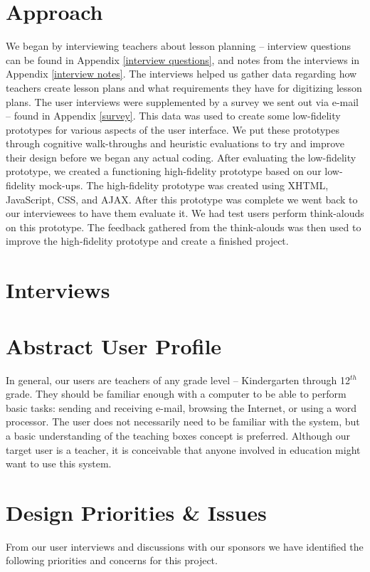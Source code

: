 \documentclass[10pt,letter]{article}
\begin{document}
\section{Approach}
We began by interviewing teachers about lesson planning -- interview questions
can be found in Appendix \ref{interview questions}, and notes from the
interviews in Appendix \ref{interview notes}. The interviews helped us gather
data regarding how teachers create lesson plans and what requirements they have
for digitizing lesson plans. The user interviews were supplemented by a survey
we sent out via e-mail -- found in Appendix \ref{survey}. This data was used to
create some low-fidelity prototypes for various aspects of the user interface.
We put these prototypes through cognitive walk-throughs and heuristic
evaluations to try and improve their design before we began any actual coding.
After evaluating the low-fidelity prototype, we created a functioning
high-fidelity prototype based on our low-fidelity mock-ups. The high-fidelity
prototype was created using XHTML, JavaScript, CSS, and AJAX. After this
prototype was complete we went back to our interviewees to have them evaluate
it. We had test users perform think-alouds on this prototype.  The feedback
gathered from the think-alouds was then used to improve the high-fidelity
prototype and create a finished project.

\section{Interviews}


\section{Abstract User Profile}
In general, our users are teachers of any grade level -- Kindergarten through
12$^{th}$ grade. They should be familiar enough with a computer to be able to
perform basic tasks: sending and receiving e-mail, browsing the Internet, or
using a word processor. The user does not necessarily need to be familiar with
the system, but a basic understanding of the teaching boxes concept is
preferred. Although our target user is a teacher, it is conceivable that anyone
involved in education might want to use this system.

\section{Design Priorities \& Issues}
From our user interviews and discussions with our sponsors we have identified
the following priorities and concerns for this project.
\end{document}
